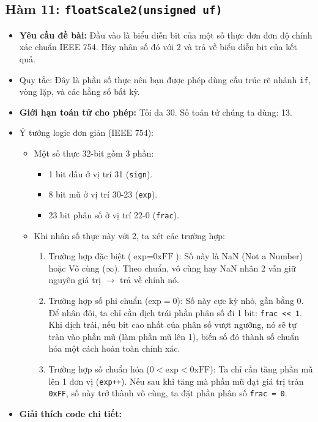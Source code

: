 \documentclass[12pt, a4paper]{article}
\begin{document}
\subsection{Hàm 11: \texttt{floatScale2(unsigned uf)}}
\begin{itemize}
    \item \textbf{Yêu cầu đề bài:} Đầu vào là biểu diễn bit của một số thực đơn đơn độ chính xác chuẩn IEEE 754. Hãy nhân số đó với 2 và trả về biểu diễn bit của kết quả.
    \item Quy tắc: Đây là phần số thực nên bạn được phép dùng cấu trúc rẽ nhánh \texttt{if}, vòng lặp, và các hằng số bất kỳ.
    \item \textbf{Giới hạn toán tử cho phép:} Tối đa 30. Số toán tử chúng ta dùng: 13.
    \item Ý tưởng logic đơn giản (IEEE 754):
    \begin{itemize}
        \item Một số thực 32-bit gồm 3 phần:
        \begin{itemize}
            \item 1 bit dấu ở vị trí 31 (\texttt{sign}).
            \item 8 bit mũ ở vị trí 30-23 (\texttt{exp}).
            \item 23 bit phân số ở vị trí 22-0 (\texttt{frac}).
        \end{itemize}
        \item Khi nhân số thực này với 2, ta xét các trường hợp:
        \begin{enumerate}
            \item Trường hợp đặc biệt ($\text{exp} = \text{0xFF}$): Số này là NaN (Not a Number) hoặc Vô cùng ($\infty$). Theo chuẩn, vô cùng hay NaN nhân 2 vẫn giữ nguyên giá trị $\rightarrow$ trả về chính nó.
            \item Trường hợp số phi chuẩn ($\text{exp} = 0$): Số này cực kỳ nhỏ, gần bằng 0. Để nhân đôi, ta chỉ cần dịch trái phần phân số đi 1 bit: \texttt{frac << 1}. Khi dịch trái, nếu bit cao nhất của phân số vượt ngưỡng, nó sẽ tự tràn vào phần mũ (làm phần mũ lên 1), biến số đó thành số chuẩn hóa một cách hoàn toàn chính xác.
            \item Trường hợp số chuẩn hóa ($0 < \text{exp} < \text{0xFF}$): Ta chỉ cần tăng phần mũ lên 1 đơn vị (\texttt{exp++}). Nếu sau khi tăng mà phần mũ đạt giá trị tràn \texttt{0xFF}, số này trở thành vô cùng, ta đặt phần phân số \texttt{frac = 0}.
        \end{enumerate}
    \end{itemize}
    \item \textbf{Giải thích code chi tiết:}



\end{itemize}
\end{document}
